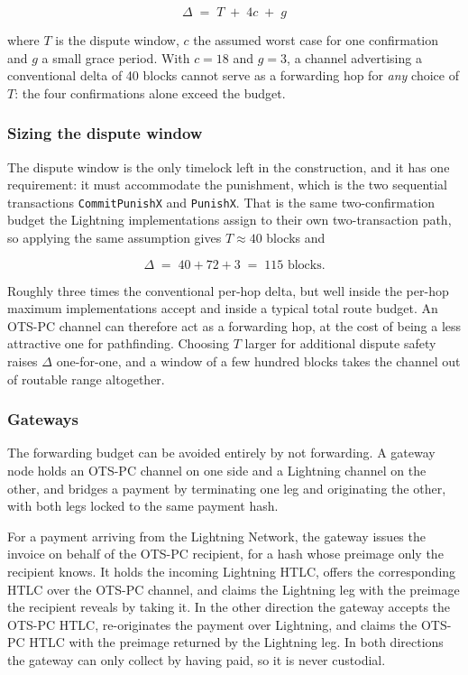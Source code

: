 \documentclass[11pt,a4paper]{article}
\newcommand{\txname}[1]{\texttt{#1}}
\begin{document}
$$\Delta \;=\; T \;+\; 4c \;+\; g$$

where $T$ is the dispute window, $c$ the assumed worst case for one confirmation and $g$ a small grace period. With $c=18$ and $g=3$, a channel advertising a conventional delta of 40 blocks cannot serve as a forwarding hop for \emph{any} choice of $T$: the four confirmations alone exceed the budget.

\subsubsection{Sizing the dispute window}

The dispute window is the only timelock left in the construction, and it has one requirement: it must accommodate the punishment, which is the two sequential transactions \txname{CommitPunishX} and \txname{PunishX}. That is the same two-confirmation budget the Lightning implementations assign to their own two-transaction path, so applying the same assumption gives $T \approx 40$ blocks and

$$\Delta \;=\; 40 + 72 + 3 \;=\; 115 \text{ blocks.}$$

Roughly three times the conventional per-hop delta, but well inside the per-hop maximum implementations accept and inside a typical total route budget. An OTS-PC channel can therefore act as a forwarding hop, at the cost of being a less attractive one for pathfinding. Choosing $T$ larger for additional dispute safety raises $\Delta$ one-for-one, and a window of a few hundred blocks takes the channel out of routable range altogether.

\subsubsection{Gateways}

The forwarding budget can be avoided entirely by not forwarding. A gateway node holds an OTS-PC channel on one side and a Lightning channel on the other, and bridges a payment by terminating one leg and originating the other, with both legs locked to the same payment hash.

For a payment arriving from the Lightning Network, the gateway issues the invoice on behalf of the OTS-PC recipient, for a hash whose preimage only the recipient knows. It holds the incoming Lightning HTLC, offers the corresponding HTLC over the OTS-PC channel, and claims the Lightning leg with the preimage the recipient reveals by taking it. In the other direction the gateway accepts the OTS-PC HTLC, re-originates the payment over Lightning, and claims the OTS-PC HTLC with the preimage returned by the Lightning leg. In both directions the gateway can only collect by having paid, so it is never custodial.
\end{document}
